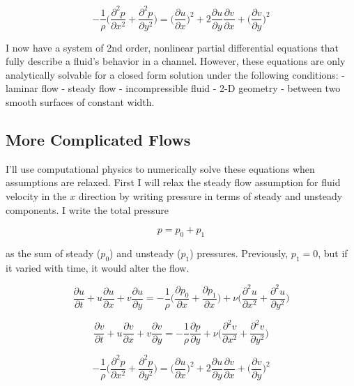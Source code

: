 \documentclass[11pt]{article}
\begin{document}
\begin{equation*}
-\frac 1\rho \biggr(\frac{\partial^2 p}{\partial x^2} + \frac{\partial^2 p}{\partial y^2}\biggr) = \biggr(\frac{\partial u}{\partial x}\biggr)^2 + 2\frac{\partial u}{\partial y}\frac{\partial v}{\partial x} + \biggr(\frac{\partial v}{\partial y}\biggr)^2
\end{equation*}

I now have a system of 2nd order, nonlinear partial differential
equations that fully describe a fluid's behavior in a channel. However,
these equations are only analytically solvable for a closed form
solution under the following conditions: - laminar flow - steady flow -
incompressible fluid - 2-D geometry - between two smooth surfaces of
constant width.

\subsection{More Complicated Flows}\label{more-complicated-flows}

I'll use computational physics to numerically solve these equations when
assumptions are relaxed. First I will relax the steady flow assumption
for fluid velocity in the \(x\) direction by writing pressure in terms
of steady and unsteady components. I write the total pressure

\[p = p_0 + p_1\]

as the sum of steady (\(p_0\)) and unsteady (\(p_1\)) pressures.
Previously, \(p_1 = 0\), but if it varied with time, it would alter the
flow.

\begin{equation}
\frac{\partial u}{\partial t} + u \frac{\partial u}{\partial x} + v\frac{\partial u}{\partial y} = -\frac 1\rho\biggr(\frac{\partial p_0}{\partial x} + \frac{\partial p_1}{\partial x}\biggr) + \nu\biggr(\frac{\partial^2 u}{\partial x^2} + \frac{\partial^2 u}{\partial y^2}\biggr)
\end{equation}

\begin{equation}
\frac{\partial v}{\partial t} + u \frac{\partial v}{\partial x} + v\frac{\partial v}{\partial y} = -\frac 1\rho\frac{\partial p}{\partial y} + \nu\biggr(\frac{\partial^2 v}{\partial x^2} + \frac{\partial^2 v}{\partial y^2}\biggr)
\end{equation}

\begin{equation}
-\frac 1\rho \biggr(\frac{\partial^2 p}{\partial x^2} + \frac{\partial^2 p}{\partial y^2}\biggr) = \biggr(\frac{\partial u}{\partial x}\biggr)^2 + 2\frac{\partial u}{\partial y}\frac{\partial v}{\partial x} + \biggr(\frac{\partial v}{\partial y}\biggr)^2
\end{equation}
\end{document}
